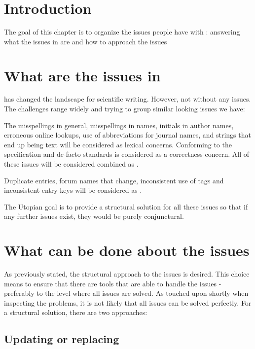 \section{Introduction}

The goal of this chapter is to organize the issues people have with
{\bibtex}: answering what the issues in {\bibtex} are
 and how to approach the {\bibtex}
issues 


\section{What are the issues in {\bibtex}}
\label{sec:intro_what_issues}

{\bibtex} has changed the landscape for scientific writing.  However,
not without any issues.  The challenges range widely and trying to
group similar looking issues we have:

The misspellings in general, misspellings in names, initials in author
names, erroneous online lookups, use of abbreviations for journal
names, and {\bibtex} strings that end up being text will be considered
as lexical concerns.  Conforming to the specification and de-facto
standards is considered as a correctness concern.  All of these issues
will be considered combined as .

Duplicate entries, forum names that change, inconsistent use of tags
and inconsistent entry keys will be considered as .

The Utopian goal is to provide a structural solution for all these
issues so that if any further issues exist, they would be purely
conjunctural.


\section{What can be done about the {\bibtex} issues}
\label{sec:intro_what_to_do}

As previously stated, the structural approach to the issues is
desired.  This choice means to ensure that there are tools that are
able to handle the issues - preferably to the level where all issues
are solved.  As touched upon shortly when inspecting the problems, it
is not likely that all issues can be solved perfectly.  For a
structural solution, there are two approaches:


\subsection{Updating or replacing {\bibtex}}

